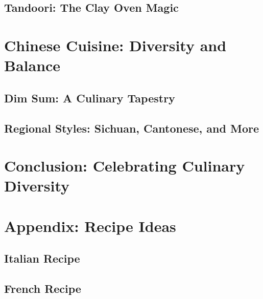 \documentclass{book}
\begin{document}
\lipsum[23-24]

\section{Tandoori: The Clay Oven Magic}

\lipsum[25-26]

\chapter{Chinese Cuisine: Diversity and Balance}

\section{Dim Sum: A Culinary Tapestry}

\lipsum[27-28]

\section{Regional Styles: Sichuan, Cantonese, and More}

\lipsum[29-30]


\chapter{Conclusion: Celebrating Culinary Diversity}

\lipsum[31-32]

\appendix
\chapter{Appendix: Recipe Ideas}
\section{Italian Recipe}
\lipsum[1]

\section{French Recipe}
\lipsum[1]
\end{document}
